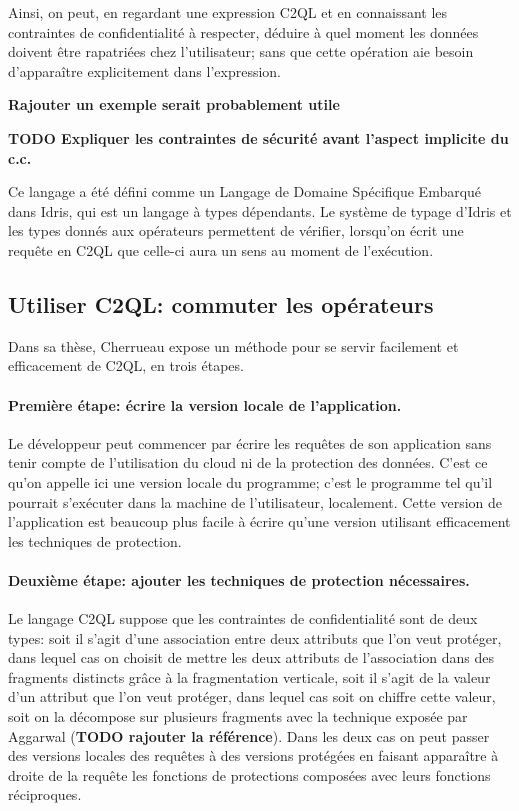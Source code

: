 Ainsi, on peut, en regardant une expression C2QL et en connaissant les
contraintes de confidentialité à respecter,
déduire à quel moment les données doivent être rapatriées chez l'utilisateur;
sans que cette opération aie besoin d'apparaître explicitement dans l'expression.

\textbf{Rajouter un exemple serait probablement utile}

\textbf{TODO Expliquer les contraintes de sécurité avant l'aspect implicite
	du c.c.}

Ce langage a été défini comme un Langage de Domaine Spécifique Embarqué dans
Idris, qui est un langage à types dépendants.
Le système de typage d'Idris et les types donnés aux opérateurs permettent
de vérifier, lorsqu'on écrit une requête en C2QL que celle-ci aura un sens
au moment de l'exécution.

\subsection{Utiliser C2QL: commuter les opérateurs}
\label{passage}
Dans sa thèse, Cherrueau expose un méthode pour se servir facilement
et efficacement de C2QL, en trois étapes.

\paragraph{Première étape: écrire la version locale de l'application.}
Le développeur peut commencer par écrire les requêtes de son application
sans tenir compte de l'utilisation du cloud ni de la protection
des données. C'est ce qu'on appelle ici une version \og locale \fg{}
du programme; c'est le programme tel qu'il pourrait s'exécuter dans la machine de l'utilisateur, localement.
Cette version de l'application est beaucoup plus facile à écrire 
qu'une version utilisant efficacement les techniques de protection.

\paragraph{Deuxième étape: ajouter les techniques de protection nécessaires.}
Le langage C2QL suppose que les contraintes de confidentialité sont de deux types:
soit il s'agit d'une association entre deux attributs que l'on veut 
protéger, dans lequel cas on choisit de mettre les deux attributs de l'association
dans des fragments distincts grâce à la fragmentation verticale, soit il s'agit de la
valeur d'un attribut que l'on veut protéger, dans lequel cas soit on chiffre cette valeur,
soit on la décompose sur plusieurs fragments avec la technique exposée par Aggarwal 
(\textbf{TODO rajouter la référence}). Dans les deux cas on peut passer des 
versions locales des requêtes à des versions protégées en faisant apparaître 
à droite de la requête les fonctions de protections composées avec leurs fonctions réciproques.

